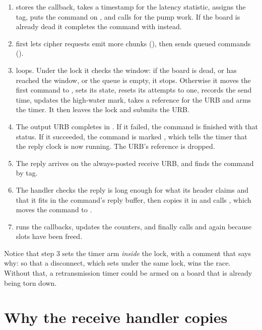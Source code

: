 \begin{enumerate}
  \item {} stores the callback, takes a timestamp for the latency statistic, assigns the tag, puts the command on , and calls  for the pump work. If the board is already dead it completes the command with  instead.
  \item {} first lets cipher requests emit more chunks (), then sends queued commands ().
  \item {} loops. Under the lock it checks the window: if the board is dead, or  has reached the window, or the queue is empty, it stops. Otherwise it moves the first command to , sets its state, resets its attempts to one, records the send time, updates the high-water mark, takes a reference for the URB and arms the timer. It then leaves the lock and submits the URB.
  \item The output URB completes in . If it failed, the command is finished with that status. If it succeeded, the command is marked , which tells the timer that the reply clock is now running. The URB's reference is dropped.
  \item The reply arrives on the always-posted receive URB, and  finds the command by tag.
  \item The handler checks the reply is long enough for what its header claims and that it fits in the command's reply buffer, then copies it in and calls , which moves the command to .
  \item {} runs the callbacks, updates the counters, and finally calls  and  again because slots have been freed.
\end{enumerate}

Notice that step 3 sets the timer arm \emph{inside} the lock, with a comment that says why: so that a disconnect, which sets  under the same lock, wins the race. Without that, a retransmission timer could be armed on a board that is already being torn down.

\section{Why the receive handler copies}

